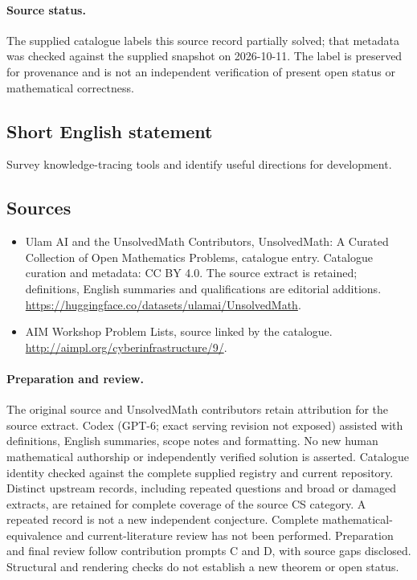 \documentclass[11pt]{article}
\begin{document}
\paragraph{Source status.}
The supplied catalogue labels this source record partially solved; that metadata was checked against the supplied snapshot on 2026-10-11. The label is preserved for provenance and is not an independent verification of present open status or mathematical correctness.
\subsection{Short English statement}
Survey knowledge-tracing tools and identify useful directions for development.
\subsection{Sources}
\begin{itemize}
\item[\hypertarget{source:statement:1}{S1}] Ulam AI and the UnsolvedMath Contributors, UnsolvedMath: A Curated Collection of Open Mathematics Problems, catalogue entry. Catalogue curation and metadata: CC BY 4.0. The source extract is retained; definitions, English summaries and qualifications are editorial additions.
\url{https://huggingface.co/datasets/ulamai/UnsolvedMath}.
\item[\hypertarget{source:statement:2}{S2}] AIM Workshop Problem Lists, source linked by the catalogue.
\url{http://aimpl.org/cyberinfrastructure/9/}.
\end{itemize}
\paragraph{Preparation and review.}
The original source and UnsolvedMath contributors retain attribution for the source extract. Codex (GPT-6; exact serving revision not exposed) assisted with definitions, English summaries, scope notes and formatting. No new human mathematical authorship or independently verified solution is asserted. Catalogue identity checked against the complete supplied registry and current repository. Distinct upstream records, including repeated questions and broad or damaged extracts, are retained for complete coverage of the source CS category. A repeated record is not a new independent conjecture. Complete mathematical-equivalence and current-literature review has not been performed. Preparation and final review follow contribution prompts C and D, with source gaps disclosed. Structural and rendering checks do not establish a new theorem or open status.
\label{end:statement}
\end{document}
